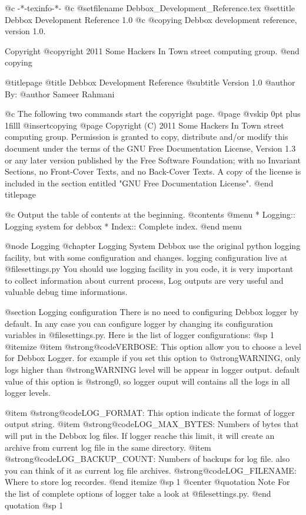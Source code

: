    @c -*-texinfo-*-
@c %
@setfilename Debbox_Development_Reference.tex
@settitle Debbox Development Reference 1.0
@c %
@copying
Debbox development reference, version 1.0.

Copyright @copyright{} 2011 Some Hackers In Town street computing group.
@end copying

@titlepage
@title Debbox Development Reference
@subtitle Version 1.0
@author By:
@author Sameer Rahmani

@c The following two commands start the copyright page.
@page
@vskip 0pt plus 1filll
@insertcopying
@page
Copyright (C)  2011  Some Hackers In Town street computing group.
Permission is granted to copy, distribute and/or modify this document
under the terms of the GNU Free Documentation License, Version 1.3
or any later version published by the Free Software Foundation;
with no Invariant Sections, no Front-Cover Texts, and no Back-Cover Texts.
A copy of the license is included in the section entitled "GNU
Free Documentation License".
@end titlepage

@c Output the table of contents at the beginning.
@contents
@menu
* Logging::     Logging system for debbox
* Index::            Complete index.
@end menu

@node Logging
@chapter Logging System
Debbox use the original python logging facility, but with some configuration and changes. logging configuration live at @file{settings.py}
You should use logging facility in you code, it is very important to collect information about current process, Log outputs are very useful and
valuable debug time informations.

@section Logging configuration
There is no need to configuring Debbox logger by default. In any case you can configure logger by changing its configuration variables in 
@file{settings.py}. Here is the list of logger configurations:
@sp 1
@itemize
@item
@strong{@code{VERBOSE}}: This option allow you to choose a level for Debbox Logger. for example if you set this option to @strong{WARNING}, only logs 
higher than @strong{WARNING} level will be appear in logger output. default value of this option is @strong{0}, so logger ouput will contains all the logs in all logger levels.

@item
@strong{@code{LOG_FORMAT}}: This option indicate the format of logger output string.
@item
@strong{@code{LOG_MAX_BYTES}}: Numbers of bytes that will put in the Debbox log files. If logger reache this limit, it will create an archive from current log file in the same directory.
@item
@strong{@code{LOG_BACKUP_COUNT}}: Numbers of backups for log file. also you can think of it as current log file archives.
@strong{@code{LOG_FILENAME}}: Where to store log recordes.
@end itemize
@sp 1
@center
@quotation Note
For the list of complete options of logger take a look at @file{settings.py}.
@end quotation
@sp 1

